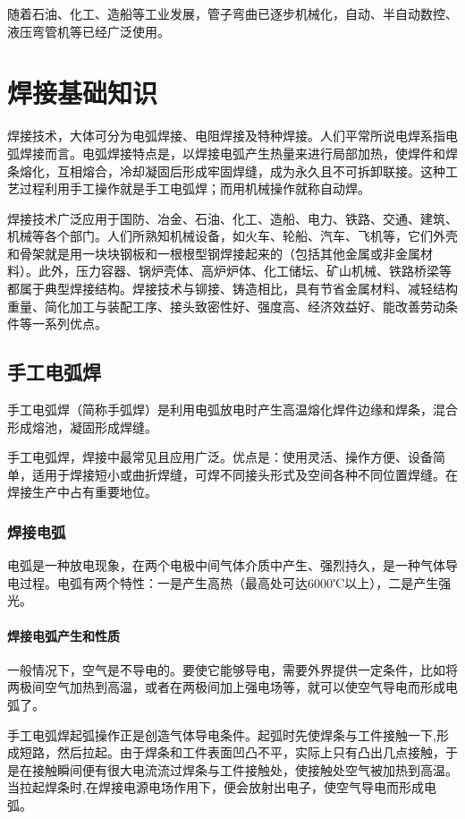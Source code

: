 \documentclass{ctexbook}
\begin{document}
随着石油、化工、造船等工业发展，管子弯曲已逐步机械化，自动、半自动数控、液压弯管机等已经广泛使用。
\chapter{焊接基础知识}
焊接技术，大体可分为电弧焊接、电阻焊接及特种焊接。人们平常所说电焊系指电弧焊接而言。电弧焊接特点是，以焊接电弧产生热量来进行局部加热，使焊件和焊条熔化，互相熔合，冷却凝固后形成牢固焊缝，成为永久且不可拆卸联接。这种工艺过程利用手工操作就是手工电弧焊；而用机械操作就称自动焊。

焊接技术广泛应用于国防、冶金、石油、化工、造船、电力、铁路、交通、建筑、机械等各个部门。人们所熟知机械设备，如火车、轮船、汽车、飞机等，它们外壳和骨架就是用一块块钢板和一根根型钢焊接起来的（包括其他金属或非金属材料）。此外，压力容器、锅炉壳体、高炉炉体、化工储坛、矿山机械、铁路桥梁等都属于典型焊接结构。焊接技术与铆接、铸造相比，具有节省金属材料、减轻结构重量、简化加工与装配工序、接头致密性好、强度高、经济效益好、能改善劳动条件等一系列优点。
\section{手工电弧焊}
手工电弧焊（简称手弧焊）是利用电弧放电时产生高温熔化焊件边缘和焊条，混合形成熔池，凝固形成焊缝。

手工电弧焊，焊接中最常见且应用广泛。优点是：使用灵活、操作方便、设备简单，适用于焊接短小或曲折焊缝，可焊不同接头形式及空间各种不同位置焊缝。在焊接生产中占有重要地位。
\subsection{焊接电弧}
电弧是一种放电现象，在两个电极中间气体介质中产生、强烈持久，是一种气体导电过程。电弧有两个特性：一是产生高热（最高处可达6000℃以上），二是产生强光。
\subsubsection{焊接电弧产生和性质}
一般情况下，空气是不导电的。要使它能够导电，需要外界提供一定条件，比如将两极间空气加热到高温，或者在两极间加上强电场等，就可以使空气导电而形成电弧了。

手工电弧焊起弧操作正是创造气体导电条件。起弧时先使焊条与工件接触一下,形成短路，然后拉起。由于焊条和工件表面凹凸不平，实际上只有凸出几点接触，于是在接触瞬间便有很大电流流过焊条与工件接触处，使接触处空气被加热到高温。当拉起焊条时,在焊接电源电场作用下，便会放射出电子，使空气导电而形成电弧。
\end{document}
